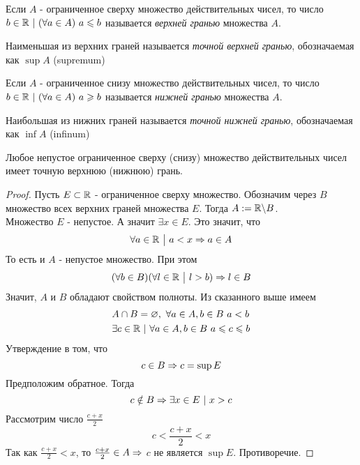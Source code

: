 \begin{definition}
    Если $A$ - ограниченное сверху множество действительных чисел, то число $b \in \mathbb{R}\ |\ (\forall a \in A)\ a \leqslant b$ называется \textit{верхней гранью} множества $A$.
    
    Наименьшая из верхних граней называется \textit{точной верхней гранью}, обозначаемая как $\sup A$ (supremum)
\end{definition}

\begin{definition}
    Если $A$ - ограниченное снизу множество действительных чисел, то число $b \in \mathbb{R}\ |\ (\forall a \in A)\ a \geqslant b$ называется \textit{нижней гранью} множества $A$.
    
    Наибольшая из нижних граней называется \textit{точной нижней гранью}, обозначаемая как $\inf A$ (infinum)
\end{definition}

\begin{proposition}
    Любое непустое ограниченное сверху (снизу) множество действительных чисел имеет точную верхнюю (нижнюю) грань.
\end{proposition}

\begin{proof}
    Пусть $E \subset \mathbb{R}$ - ограниченное сверху множество. Обозначим через $B$ множество всех верхних граней множества $E$. Тогда $A := \mathbb{R} \backslash B$. \\
    Множество $E$ - непустое. А значит $\exists x \in E$. Это значит, что
    \[
    	\forall a \in \mathbb{R} \ \big|\  a < x \Rightarrow a \in A
    \]
    То есть и $A$ - непустое множество. При этом
    \[
    	(\forall b \in B) (\forall l \in \mathbb{R} \ \big|\  l > b) \Rightarrow l \in B
    \]
    Значит, $A$ и $B$ обладают свойством полноты. Из сказанного выше имеем
    \begin{align*}
        &A \cap B = \varnothing,\ \forall a \in A, b \in B\ a < b
        \\
        &\exists c \in \mathbb{R}\ |\ \forall a \in A, b \in B\ a \leqslant c \leqslant b
    \end{align*}
    Утверждение в том, что
    \[
        c \in B \Rightarrow c = \sup E
    \]
    Предположим обратное. Тогда
    \[
        c \notin B \Rightarrow \exists x \in E\ |\ x > c
    \]
    Рассмотрим число $\frac{c + x}{2}$
    \[
        c < \frac{c + x}{2} < x
    \]
    Так как $\frac{c + x}{2} < x$, то $\frac{c + x}{2} \in A \Rightarrow$ $c$ не является $\sup E$. Противоречие.
\end{proof}